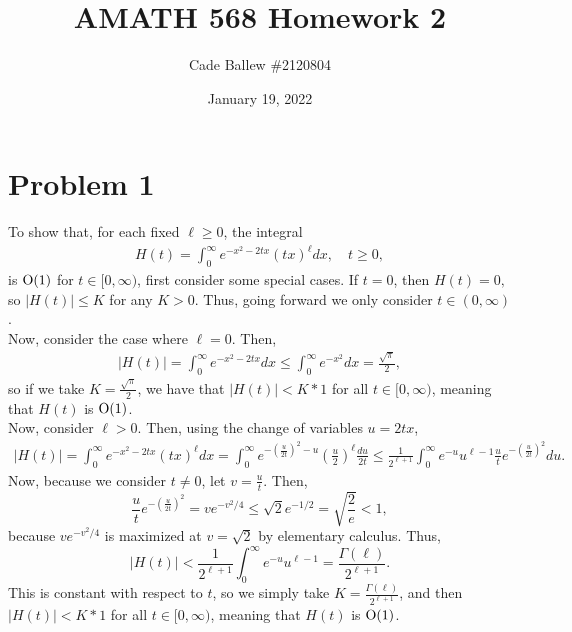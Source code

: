 \documentclass{article}
\title{AMATH 568 Homework 2}
\author{Cade Ballew \#2120804}
\date{January 19, 2022}
\begin{document}
	
\maketitle
	
\section{Problem 1}
To show that, for each fixed $\ell\geq0$, the integral
\begin{align*}
	H(t) = \int_0^\infty e^{-x^2 - 2 t x} (tx)^\ell dx, \quad t \geq 0,
\end{align*}
is $\operatorname{O}(1)$ for $t \in [0,\infty)$, first consider some special cases. If $t=0$, then $H(t)=0,$ so $|H(t)|\leq K$ for any $K>0$. Thus, going forward we only consider $t \in (0,\infty)$.\\
Now, consider the case where $\ell=0$. Then, 
\begin{align*}
|H(t)|=\int_0^\infty e^{-x^2 - 2t x} dx\leq\int_0^\infty e^{-x^2} dx=\frac{\sqrt{\pi}}{2},
\end{align*}
so if we take $K=\frac{\sqrt{\pi}}{2}$, we have that $|H(t)|<K*1$ for all $t \in [0,\infty)$, meaning that $H(t)$ is $\operatorname{O}(1)$.\\
Now, consider $\ell>0$. Then, using the change of variables $u=2tx$,
\begin{align*}
	|H(t)| = \int_0^\infty e^{-x^2 - 2 t x} (tx)^\ell dx=\int_0^\infty e^{-\left(\frac{u}{2t}\right)^2 - u} \left(\frac{u}{2}\right)^\ell \frac{du}{2t}\leq\frac{1}{2^{\ell+1}}\int_0^\infty e^{-u}u^{\ell-1}\frac{u}{t}e^{-\left(\frac{u}{2t}\right)^2}du.
\end{align*}
Now, because we consider $t\neq0$, let $v=\frac{u}{t}$. Then,
\[
\frac{u}{t}e^{-\left(\frac{u}{2t}\right)^2}=ve^{-v^2/4}\leq\sqrt{2}e^{-1/2}=\sqrt{\frac{2}{e}}<1,
\] 
because $ve^{-v^2/4}$ is maximized at $v=\sqrt{2}$ by elementary calculus. Thus, 
\[
|H(t)|<\frac{1}{2^{\ell+1}}\int_0^\infty e^{-u}u^{\ell-1}=\frac{\Gamma(\ell)}{2^{\ell+1}}.
\]
This is constant with respect to $t$, so we simply take $K=\frac{\Gamma(\ell)}{2^{\ell+1}}$, and then $|H(t)|<K*1$ for all $t \in [0,\infty)$, meaning that $H(t)$ is $\operatorname{O}(1)$.
\end{document}
